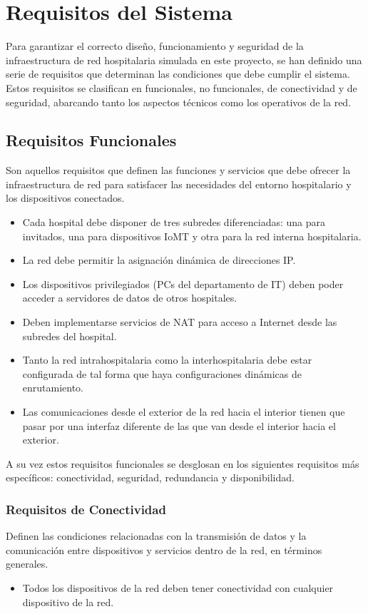\section{Requisitos del Sistema}
Para garantizar el correcto diseño, funcionamiento y seguridad de la infraestructura de red hospitalaria simulada en este proyecto, se han definido una serie de requisitos 
que determinan las condiciones que debe cumplir el sistema. Estos requisitos se clasifican en funcionales, no funcionales, de conectividad y de seguridad, abarcando tanto 
los aspectos técnicos como los operativos de la red.

\subsection{Requisitos Funcionales}
Son aquellos requisitos que definen las funciones y servicios que debe ofrecer la infraestructura de red para satisfacer las necesidades del entorno hospitalario y los 
dispositivos conectados.
\begin{itemize}
    \item Cada hospital debe disponer de tres subredes diferenciadas: una para invitados, una para dispositivos IoMT y otra para la red interna hospitalaria.
    \item La red debe permitir la asignación dinámica de direcciones IP.
    \item Los dispositivos privilegiados (\ac{PC}s del departamento de IT) deben poder acceder a servidores de datos de otros hospitales.
    \item Deben implementarse servicios de NAT para acceso a Internet desde las subredes del hospital.
    \item Tanto la red intrahospitalaria como la interhospitalaria debe estar configurada de tal forma que haya configuraciones dinámicas de enrutamiento.
    \item Las comunicaciones desde el exterior de la red hacia el interior tienen que pasar por una interfaz diferente de las que van desde el interior hacia el exterior.
\end{itemize}
A su vez estos requisitos funcionales se desglosan en los siguientes requisitos más específicos: conectividad, seguridad, redundancia y disponibilidad.
\subsubsection{Requisitos de Conectividad}
Definen las condiciones relacionadas con la transmisión de datos y la comunicación entre dispositivos y servicios dentro de la red, en términos generales.
\begin{itemize}
    \item Todos los dispositivos de la red deben tener conectividad con cualquier dispositivo de la red.
\end{itemize}

